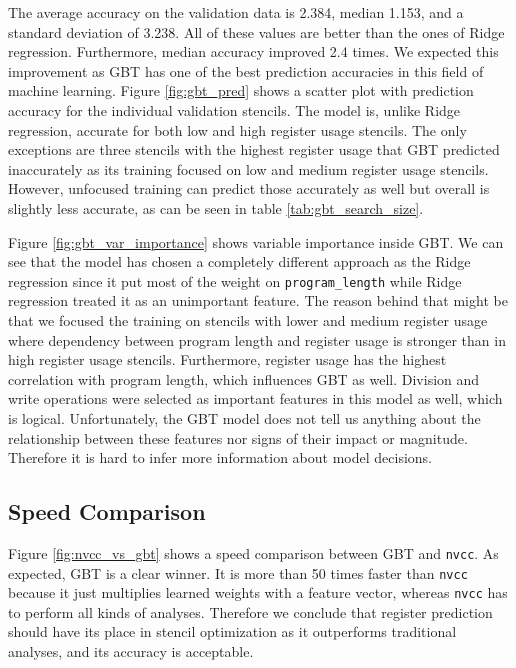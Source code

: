 \documentclass[sigplan,\review anonymous]{acmart}
\begin{document}
The average accuracy on the validation data is 2.384, median 1.153, and a
standard deviation of 3.238. All of these values are better than the ones of
Ridge regression. Furthermore, median accuracy improved 2.4 times. We
expected this improvement as GBT has one of the best prediction accuracies in
this field of machine learning. Figure \ref{fig:gbt_pred} shows a scatter plot
with prediction accuracy for the individual validation stencils. The model is,
unlike Ridge regression, accurate for both low and high register usage
stencils. The only exceptions are three stencils with the highest register
usage that GBT predicted inaccurately as its training focused on low and
medium register usage stencils. However, unfocused training can predict those
accurately as well but overall is slightly less accurate, as can be seen in
table \ref{tab:gbt_search_size}.

Figure \ref{fig:gbt_var_importance} shows variable importance inside GBT. We
can see that the model has chosen a completely different approach as the Ridge
regression since it put most of the weight on \texttt{program\_length} while
Ridge regression treated it as an unimportant feature. The reason behind that
might be that we focused the training on stencils with lower and medium
register usage where dependency between program length and register usage is
stronger than in high register usage stencils. Furthermore, register usage has
the highest correlation with program length, which influences GBT as well.
Division and write operations were selected as important features in this
model as well, which is logical. Unfortunately, the GBT model does not tell
us anything about the relationship between these features nor signs of their
impact or magnitude. Therefore it is hard to infer more information about
model decisions.

\subsection{Speed Comparison}

Figure \ref{fig:nvcc_vs_gbt} shows a speed comparison between GBT
and \texttt{nvcc}. As expected, GBT is a clear winner. It is more than 50
times faster than \texttt{nvcc} because it just multiplies learned weights
with a feature vector, whereas \texttt{nvcc} has to perform all kinds of
analyses. Therefore we conclude that register prediction should have its
place in stencil optimization as it outperforms traditional analyses,
and its accuracy is acceptable.
\end{document}
